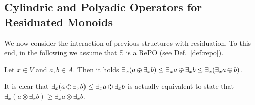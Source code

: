 \documentclass{llncs}
\def\monop{\otimes}
\def\odiv{\, {\ominus\hspace{-7.7pt} \div} \,}
\begin{document}


\subsection{Cylindric and Polyadic Operators for Residuated Monoids}
\label{cyre}
We now consider 
the interaction of previous structures with residuation. 
%
To this end, in the following we assume that 
$\mathbb{S}$ is a RePO (see Def.~\ref{def:repo}).


\begin{lemma}
\label{divex}
Let $x \in V$ and $a, b \in A$.
Then it holds
         $\exists_x(a \odiv \exists_x b) \leq \exists_x a \odiv \exists_x b \leq
                                               \exists_x(\exists_x a \odiv b)$.
\end{lemma}



\begin{remark}
\label{remdiv}
It is clear that $\exists_x(a \odiv \exists_x b) \leq \exists_x a \odiv \exists_x b$
is actually equivalent to state that
$\exists_x(a \monop \exists_x b) \geq \exists_x a \monop \exists_x b$.
\end{remark}
\end{document}
